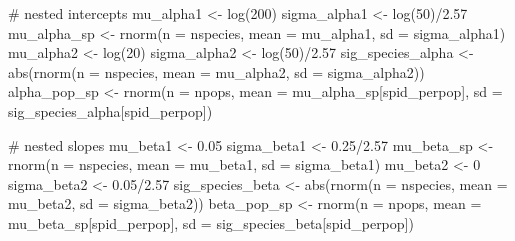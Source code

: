 \documentclass[
  letterpaper,
  DIV=11,
  numbers=noendperiod]{scrartcl}
\newenvironment{Shaded}{\begin{snugshade}}{\end{snugshade}}
\newcommand{\AttributeTok}[1]{\textcolor[rgb]{0.40,0.45,0.13}{#1}}
\newcommand{\CommentTok}[1]{\textcolor[rgb]{0.37,0.37,0.37}{#1}}
\newcommand{\DecValTok}[1]{\textcolor[rgb]{0.68,0.00,0.00}{#1}}
\newcommand{\FloatTok}[1]{\textcolor[rgb]{0.68,0.00,0.00}{#1}}
\newcommand{\FunctionTok}[1]{\textcolor[rgb]{0.28,0.35,0.67}{#1}}
\newcommand{\NormalTok}[1]{\textcolor[rgb]{0.00,0.23,0.31}{#1}}
\newcommand{\OtherTok}[1]{\textcolor[rgb]{0.00,0.23,0.31}{#1}}
\newcommand{\SpecialCharTok}[1]{\textcolor[rgb]{0.37,0.37,0.37}{#1}}
\begin{document}
\begin{Shaded}
\begin{Highlighting}[]
\CommentTok{\# nested intercepts}
\NormalTok{mu\_alpha1 }\OtherTok{\textless{}{-}} \FunctionTok{log}\NormalTok{(}\DecValTok{200}\NormalTok{)}
\NormalTok{sigma\_alpha1 }\OtherTok{\textless{}{-}}  \FunctionTok{log}\NormalTok{(}\DecValTok{50}\NormalTok{)}\SpecialCharTok{/}\FloatTok{2.57}
\NormalTok{mu\_alpha\_sp }\OtherTok{\textless{}{-}} \FunctionTok{rnorm}\NormalTok{(}\AttributeTok{n =}\NormalTok{ nspecies, }\AttributeTok{mean =}\NormalTok{ mu\_alpha1, }\AttributeTok{sd =}\NormalTok{ sigma\_alpha1)}
\NormalTok{mu\_alpha2 }\OtherTok{\textless{}{-}} \FunctionTok{log}\NormalTok{(}\DecValTok{20}\NormalTok{)}
\NormalTok{sigma\_alpha2 }\OtherTok{\textless{}{-}} \FunctionTok{log}\NormalTok{(}\DecValTok{50}\NormalTok{)}\SpecialCharTok{/}\FloatTok{2.57}
\NormalTok{sig\_species\_alpha }\OtherTok{\textless{}{-}} \FunctionTok{abs}\NormalTok{(}\FunctionTok{rnorm}\NormalTok{(}\AttributeTok{n =}\NormalTok{ nspecies, }\AttributeTok{mean =}\NormalTok{ mu\_alpha2, }
                               \AttributeTok{sd =}\NormalTok{ sigma\_alpha2))}
\NormalTok{alpha\_pop\_sp }\OtherTok{\textless{}{-}} \FunctionTok{rnorm}\NormalTok{(}\AttributeTok{n =}\NormalTok{ npops, }\AttributeTok{mean =}\NormalTok{ mu\_alpha\_sp[spid\_perpop], }
                      \AttributeTok{sd =}\NormalTok{ sig\_species\_alpha[spid\_perpop]) }

\CommentTok{\# nested slopes}
\NormalTok{mu\_beta1 }\OtherTok{\textless{}{-}} \FloatTok{0.05}
\NormalTok{sigma\_beta1 }\OtherTok{\textless{}{-}} \FloatTok{0.25}\SpecialCharTok{/}\FloatTok{2.57}
\NormalTok{mu\_beta\_sp }\OtherTok{\textless{}{-}} \FunctionTok{rnorm}\NormalTok{(}\AttributeTok{n =}\NormalTok{ nspecies, }\AttributeTok{mean =}\NormalTok{ mu\_beta1, }\AttributeTok{sd =}\NormalTok{ sigma\_beta1)}
\NormalTok{mu\_beta2 }\OtherTok{\textless{}{-}} \DecValTok{0}
\NormalTok{sigma\_beta2 }\OtherTok{\textless{}{-}} \FloatTok{0.05}\SpecialCharTok{/}\FloatTok{2.57}
\NormalTok{sig\_species\_beta }\OtherTok{\textless{}{-}} \FunctionTok{abs}\NormalTok{(}\FunctionTok{rnorm}\NormalTok{(}\AttributeTok{n =}\NormalTok{ nspecies, }\AttributeTok{mean =}\NormalTok{ mu\_beta2, }
                              \AttributeTok{sd =}\NormalTok{ sigma\_beta2))}
\NormalTok{beta\_pop\_sp }\OtherTok{\textless{}{-}} \FunctionTok{rnorm}\NormalTok{(}\AttributeTok{n =}\NormalTok{ npops, }\AttributeTok{mean =}\NormalTok{ mu\_beta\_sp[spid\_perpop], }
                     \AttributeTok{sd =}\NormalTok{ sig\_species\_beta[spid\_perpop]) }


\end{Highlighting}
\end{Shaded}
\end{document}
